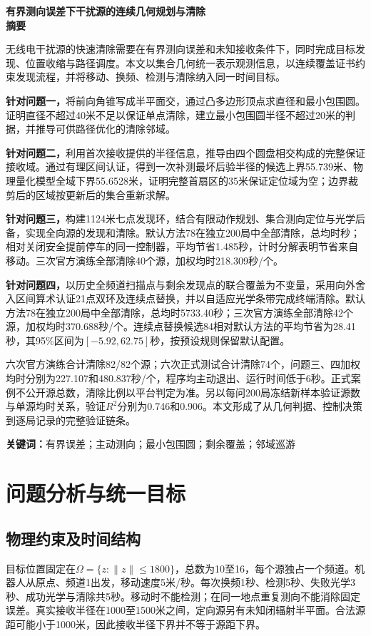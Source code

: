 \documentclass[UTF8,a4paper,zihao=-4,fontset=fandol]{ctexart}
\begin{document}
\begin{center}{\bfseries 有界测向误差下干扰源的连续几何规划与清除}\\[8pt]{\large\bfseries 摘\quad 要}\end{center}
无线电干扰源的快速清除需要在有界测向误差和未知接收条件下，同时完成目标发现、位置收缩与路径调度。本文以集合几何统一表示观测信息，以连续覆盖证书约束发现流程，并将移动、换频、检测与清除纳入同一时间目标。

\textbf{针对问题一，}将前向角锥写成半平面交，通过凸多边形顶点求直径和最小包围圆。证明直径不超过40米不足以保证单点清除，建立最小包围圆半径不超过20米的判据，并推导可供路径优化的清除邻域。

\textbf{针对问题二，}利用首次接收提供的半径信息，推导由四个圆盘相交构成的完整保证接收域。通过有理区间认证，得到一次补测最坏后验半径的候选上界55.739米、物理量化模型全域下界55.6528米，证明完整首扇区的35米保证定位域为空；边界裁剪后的区域按更新后的集合重新求解。

\textbf{针对问题三，}构建1124米七点发现环，结合有限动作规划、集合测向定位与光学后备，实现全向源的发现和清除。默认方法78在独立200局中全部清除，总均时\QthreeMean{}秒；相对关闭安全提前停车的同一控制器，平均节省1.485秒，计时分解表明节省来自移动。三次官方演练全部清除40个源，加权均时218.309秒/个。

\textbf{针对问题四，}以历史全频道扫描点与剩余发现点的联合覆盖为不变量，采用向外舍入区间算术认证21点双环及连续点替换，并以自适应光学条带完成终端清除。默认方法78在独立200局中全部清除，总均时5733.40秒；三次官方演练全部清除42个源，加权均时370.688秒/个。连续点替换候选84相对默认方法的平均节省为28.41秒，其95\%区间为$[-5.92,62.75]$秒，按预设规则保留默认配置。

六次官方演练合计清除82/82个源；六次正式测试合计清除74个，问题三、四加权均时分别为227.107和480.837秒/个，程序均主动退出、运行时间低于6秒。正式案例不公开源总数，清除比例以平台判定为准。另以每问200局冻结新样本验证源数与单源均时关系，验证$R^2$分别为0.746和0.906。本文形成了从几何判据、控制决策到逐局记录的完整验证链条。

\noindent\textbf{关键词：}有界误差；主动测向；最小包围圆；剩余覆盖；邻域巡游
\newpage
\section{问题分析与统一目标}
\subsection{物理约束及时间结构}
目标位置固定在$\Omega=\{z:\|z\|\le1800\}$，总数为10至16，每个源独占一个频道。机器人从原点、频道1出发，移动速度5米/秒。每次换频1秒、检测5秒、失败光学3秒、成功光学与清除共5秒。移动时不能检测；在同一地点重复测向不能消除固定误差。真实接收半径在1000至1500米之间，定向源另有未知闭辐射半平面。合法源距可能小于1000米，因此接收半径下界并不等于源距下界。
\end{document}
